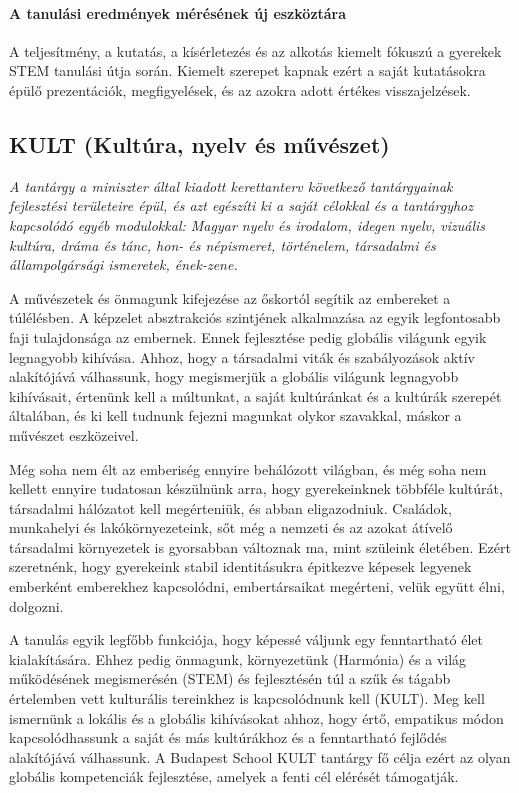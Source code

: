 \paragraph{A tanulási eredmények mérésének új eszköztára} A teljesítmény, a
kutatás, a kísérletezés és az alkotás kiemelt fókuszú a gyerekek STEM tanulási
útja során. Kiemelt szerepet kapnak ezért a saját kutatásokra épülő
prezentációk, megfigyelések, és az azokra adott értékes visszajelzések.

\subsection[KULT]{KULT (Kultúra, nyelv és művészet)}
\emph{A tantárgy a miniszter által kiadott kerettanterv következő tantárgyainak
  fejlesztési területeire épül, és azt egészíti ki a saját célokkal és a
  tantárgyhoz kapcsolódó egyéb modulokkal: Magyar nyelv és irodalom, idegen
  nyelv, vizuális kultúra, dráma és tánc, hon- és népismeret, történelem,
  társadalmi és állampolgársági ismeretek, ének-zene.}

A művészetek és önmagunk kifejezése az őskortól segítik az embereket a
túlélésben. A képzelet absztrakciós szintjének alkalmazása az egyik
legfontosabb faji tulajdonsága az embernek. Ennek fejlesztése pedig globális
világunk egyik legnagyobb kihívása. Ahhoz, hogy a társadalmi viták és
szabályozások aktív alakítójává válhassunk, hogy megismerjük a globális
világunk legnagyobb kihívásait, értenünk kell a múltunkat, a saját kultúránkat
és a kultúrák szerepét általában, és ki kell tudnunk fejezni magunkat olykor
szavakkal, máskor a művészet eszközeivel.

Még soha nem élt az emberiség ennyire behálózott világban, és még soha nem
kellett ennyire tudatosan készülnünk arra, hogy gyerekeinknek többféle
kultúrát, társadalmi hálózatot kell megérteniük, és abban eligazodniuk.
Családok, munkahelyi és lakókörnyezeteink, sőt még a nemzeti és az azokat
átívelő társadalmi környezetek is gyorsabban változnak ma, mint szüleink
életében. Ezért szeretnénk, hogy gyerekeink stabil identitásukra épitkezve
képesek legyenek emberként emberekhez kapcsolódni, embertársaikat megérteni,
velük együtt élni, dolgozni.

A tanulás egyik legfőbb funkciója, hogy képessé váljunk egy fenntartható élet
kialakítására. Ehhez pedig önmagunk, környezetünk (Harmónia) és a világ
működésének megismerésén (STEM) és fejlesztésén túl a szűk és tágabb értelemben
vett kulturális tereinkhez is kapcsolódnunk kell (KULT). Meg kell ismernünk a
lokális és a globális kihívásokat ahhoz, hogy értő, empatikus módon
kapcsolódhassunk a saját és más kultúrákhoz és a fenntartható fejlődés
alakítójává válhassunk. A Budapest School KULT tantárgy fő célja ezért az olyan
globális kompetenciák fejlesztése, amelyek a fenti cél elérését támogatják.

